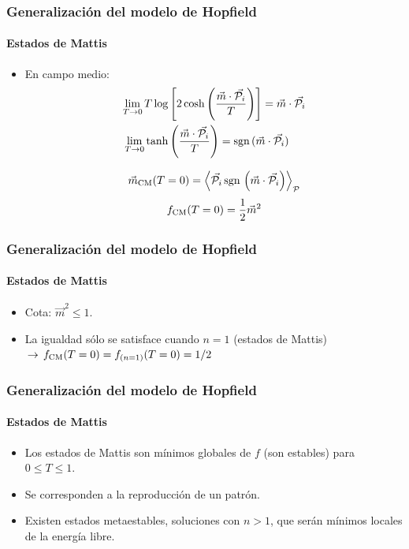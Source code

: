 \documentclass[11pt]{beamer}
\begin{document}
\begin{frame}
\frametitle{Generalización del modelo de Hopfield}
\framesubtitle{Estados de Mattis}
\begin{itemize}
	\item En campo medio:
	\begin{align*}
	\lim_{T\rightarrow0}T\log&\left[2\cosh\left(\frac{\vec{m}\cdot\vec{\mathcal{P}_i}}{T}\right)\right]=\vec{m}\cdot\vec{\mathcal{P}_i} \\
	\lim_{T\rightarrow0}\tanh&\left(\frac{\vec{m}\cdot\vec{\mathcal{P}_i}}{T}\right)=\textnormal{sgn}\,(\vec{m}\cdot\vec{\mathcal{P}_i})
	\end{align*}
	
	\begin{displaymath}
	\vec{m}_{\textnormal{CM}}(T=0)=\left<\vec{\mathcal{P}_i}\,\textnormal{sgn}\,\left(\vec{m}\cdot\vec{\mathcal{P}_i}\right)\right>_{\mathcal{P}}
	\end{displaymath}
	\begin{displaymath}
	f_{\textnormal{CM}}(T=0)=\frac{1}{2}\vec{m}^2
	\end{displaymath}
\end{itemize}
\end{frame}

\begin{frame}
\frametitle{Generalización del modelo de Hopfield}
\framesubtitle{Estados de Mattis}
\begin{itemize}
	\item Cota: $\vec{m}^2\leq1$.
	\item La igualdad sólo se satisface cuando $n=1$ (estados de Mattis)$\,\rightarrow\,f_{\textnormal{CM}}(T=0)=f_{(n=1)}(T=0)=1/2$
\end{itemize}
\end{frame}

\begin{frame}
\frametitle{Generalización del modelo de Hopfield}
\framesubtitle{Estados de Mattis}
\begin{itemize}
	\item Los estados de Mattis son mínimos globales de $f$ (son estables) para $0\leq T\leq1$.
	\item Se corresponden a la reproducción de un patrón. 
	\item Existen estados metaestables, soluciones con $n>1$, que serán mínimos locales de la energía libre.
\end{itemize}
\end{frame}
\end{document}
